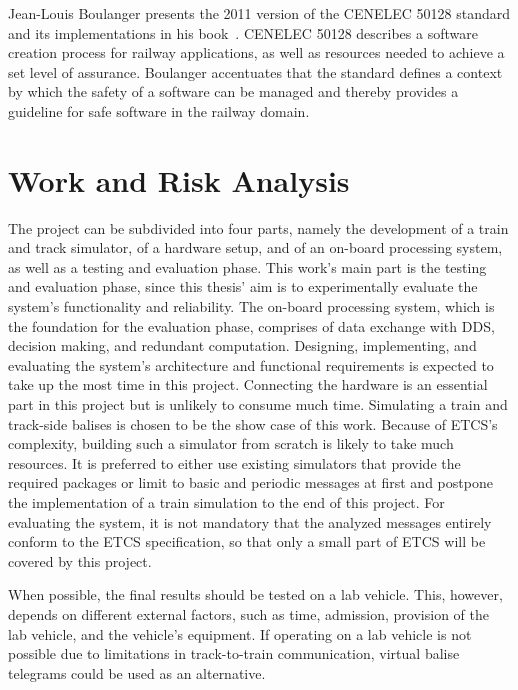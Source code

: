\documentclass[a4paper, 12pt]{scrartcl}
\begin{document}
Jean-Louis Boulanger presents the 2011 version of the CENELEC 50128 standard and its implementations in his book~\cite{BoulangerStandards}.
CENELEC 50128 describes a software creation process for railway applications, as well as resources needed to achieve a set level of assurance.
Boulanger accentuates that the standard defines a context by which the safety of a software can be managed and thereby provides a guideline for safe software in the railway domain.



\section*{Work and Risk Analysis}
The project can be subdivided into four parts, namely the development of a train and track simulator, of a hardware setup, and of an on-board processing system, as well as a testing and evaluation phase.
This work's main part is the testing and evaluation phase, since this thesis' aim is to experimentally evaluate the system's functionality and reliability.
The on-board processing system, which is the foundation for the evaluation phase, comprises of data exchange with \gls*{DDS}, decision making, and redundant computation.
Designing, implementing, and evaluating the system's architecture and functional requirements is expected to take up the most time in this project.
Connecting the hardware is an essential part in this project but is unlikely to consume much time.
Simulating a train and track-side balises is chosen to be the show case of this work.
Because of \gls*{ETCS}'s complexity, building such a simulator from scratch is likely to take much resources.
It is preferred to either use existing simulators that provide the required packages or limit to basic and periodic messages at first and postpone the implementation of a train simulation to the end of this project.
For evaluating the system, it is not mandatory that the analyzed messages entirely conform to the \gls*{ETCS} specification, so that only a small part of \gls*{ETCS} will be covered by this project.

When possible, the final results should be tested on a lab vehicle.
This, however, depends on different external factors, such as time, admission, provision of the lab vehicle, and the vehicle's equipment.
If operating on a lab vehicle is not possible due to limitations in track-to-train communication, virtual balise telegrams could be used as an alternative.




\printglossary
\end{document}
